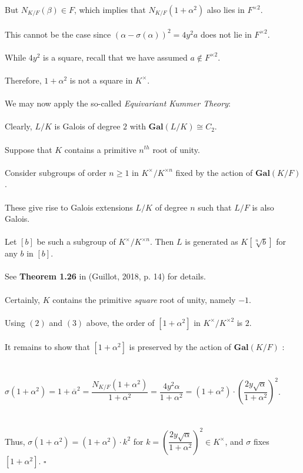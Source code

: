 \documentclass{article}
\begin{document}
But $N_{K/F}(\beta) \in F$, which implies that $N_{K/F}(1 + \alpha^2)$ also lies in $F^{\times2}$. \\\\
This cannot be the case since $(\alpha - \sigma(\alpha))^2 = 4y^2a$  does not lie in $F^{\times2}$. \\\\
\indent While $4y^2$ is a square, recall that we have assumed $a \notin F^{\times2}$. \\\\
Therefore, $1 + \alpha^2$ is not a square in $K^{\times}$. \\\\
We may now apply the so-called \emph{Equivariant Kummer Theory}: \\\\
\indent Clearly, $L/K$ is Galois of degree $2$ with $\textbf{Gal}(L/K) \cong C_2$. \\\\
\indent Suppose that $K$ contains a primitive $n^{th}$ root of unity. \\\\
\indent Consider subgroups of order $n \geq 1$ in $K^\times/K^{\times n}$ fixed by the action of $\textbf{Gal}(K/F)$. \\\\
\indent These give rise to Galois extensions $L/K$ of degree $n$ such that $L/F$ is also Galois. \\\\
\indent Let $[b]$ be such a subgroup of $K^\times/K^{\times n}$. Then $L$ is generated as $K[\sqrt[n]{b}]$ for any $b$ in $[b]$.  \\\\
\indent See \textbf{Theorem 1.26} in (Guillot, 2018, p. 14) for details. \\\\
Certainly, $K$ contains the primitive \emph{square} root of unity, namely $-1$. \\\\
Using $(2)$ and $(3)$ above, the order of $[1 + \alpha^2]$ in $K^\times/K^{\times2}$ is $2$. \\\\
It remains to show that $[1 + \alpha^2]$ is preserved by the action of $\textbf{Gal}(K/F)$ : \\\\\\
\indent $\sigma(1 + \alpha^2) = 1 + \overline{\alpha}^2 = \dfrac{N_{K/F}(1 + \alpha^2)}{1 + \alpha^2} = \dfrac{4y^2\alpha}{1 + \alpha^2} = (1 + \alpha^2) \cdot \left(\dfrac{2y\sqrt{\alpha}}{1 + \alpha^2}\right)^2$. \\\\\\
Thus, $\sigma(1 + \alpha^2) = (1 + \alpha^2) \cdot k^2$ for $k = \left(\dfrac{2y\sqrt{\alpha}}{1 + \alpha^2}\right)^2 \in K^\times$, and $\sigma$ fixes $[1 + \alpha^2]$. $\square$ \\\\
\\
\end{document}
